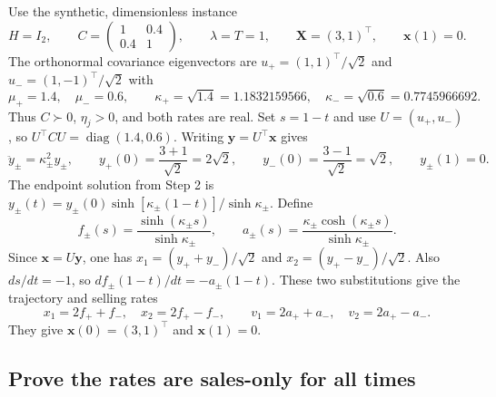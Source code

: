 \documentclass[11pt,a4paper]{article}
\begin{document}
Use the synthetic, dimensionless instance
\[
 H=I_2,\qquad C=\begin{pmatrix}1&0.4\\0.4&1\end{pmatrix},\qquad
 \lambda=T=1,\qquad\mathbf X=(3,1)^\top,\qquad\mathbf x(1)=0.
\]
The orthonormal covariance eigenvectors are
$u_+=(1,1)^\top/\sqrt2$ and $u_-=(1,-1)^\top/\sqrt2$ with
\[
 \mu_+=1.4,\quad\mu_-=0.6,\qquad
 \kappa_+=\sqrt{1.4}=1.1832159566,\quad
 \kappa_-=\sqrt{0.6}=0.7745966692.
\]
Thus $C\succ0$, $\eta_j>0$, and both rates are real. Set $s=1-t$ and
use $U=(u_+,u_-)$, so $U^\top C U=\operatorname{diag}(1.4,0.6)$.
Writing $\mathbf y=U^\top\mathbf x$ gives
\[
 \ddot y_\pm=\kappa_\pm^2y_\pm,\qquad
 y_+(0)=\frac{3+1}{\sqrt2}=2\sqrt2,\qquad
 y_-(0)=\frac{3-1}{\sqrt2}=\sqrt2,\qquad y_\pm(1)=0.
\]
The endpoint solution from Step 2 is
$y_\pm(t)=y_\pm(0)\sinh[\kappa_\pm(1-t)]/\sinh\kappa_\pm$.
Define
\[
 f_\pm(s)=\frac{\sinh(\kappa_\pm s)}{\sinh\kappa_\pm},\qquad
 a_\pm(s)=\frac{\kappa_\pm\cosh(\kappa_\pm s)}{\sinh\kappa_\pm}.
\]
Since $\mathbf x=U\mathbf y$, one has
$x_1=(y_++y_-)/\sqrt2$ and $x_2=(y_+-y_-)/\sqrt2$.
Also $ds/dt=-1$, so $df_\pm(1-t)/dt=-a_\pm(1-t)$.
These two substitutions give the trajectory and selling rates
\begin{equation}
 x_1=2f_++f_-,\quad x_2=2f_+-f_-,\qquad
 v_1=2a_++a_-,\quad v_2=2a_+-a_-.
 \label{eq:stage3-rates}
\end{equation}
They give $\mathbf x(0)=(3,1)^\top$ and $\mathbf x(1)=0$.

\subsection*{Prove the rates are sales-only for all times}
\end{document}
